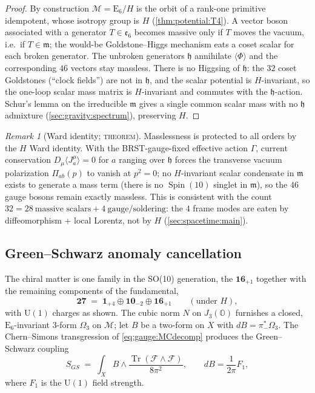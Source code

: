 \documentclass[11pt]{article}
\theoremstyle{plain}
\theoremstyle{definition}
\theoremstyle{remark}
\newtheorem{remark}[theorem]{Remark}
\newcommand{\U}[1]{\mathrm{U}(#1)}
\newcommand{\E}[1]{\mathrm{E}_{#1}}
\newcommand{\Spin}{\operatorname{Spin}}
\newcommand{\Tr}{\operatorname{Tr}}
\newcommand{\Uone}{\U{1}}
\newcommand{\ESix}{\E{6}}
\begin{document}
\begin{proof}
By construction $\mathcal M=\ESix/H$ is the orbit of a rank-one primitive
idempotent, whose isotropy group is $H$ (\autoref{thm:potential:T4}).
A vector boson associated with a generator $T\in\mathfrak e_6$ becomes
massive only if $T$ moves the vacuum, i.e.\ if $T\in\mathfrak m$; the
would-be Goldstone--Higgs mechanism eats a coset scalar for each broken
generator. The unbroken generators $\mathfrak h$ annihilate
$\langle\Phi\rangle$ and the corresponding $46$ vectors stay massless.
There is no Higgsing of $\mathfrak h$: the $32$ coset Goldstones
(``clock fields'') are not in $\mathfrak h$, and the scalar potential is
$H$-invariant, so the one-loop scalar mass matrix is $H$-invariant and
commutes with the $\mathfrak h$-action. Schur's lemma on the irreducible
$\mathfrak m$ gives a single common scalar mass with no $\mathfrak h$
admixture (\autoref{sec:gravity:spectrum}), preserving $H$.
\end{proof}

\begin{remark}[Ward identity; \textsc{theorem}]\label{rem:gauge:ward}
Masslessness is protected to all orders by the $H$ Ward identity. With
the BRST-gauge-fixed effective action $\Gamma$, current conservation
$D_\mu\langle J^{\mu}_{a}\rangle=0$ for $a$ ranging over $\mathfrak h$
forces the transverse vacuum polarization $\Pi_{ab}(p)$ to vanish at
$p^2=0$; no $H$-invariant scalar condensate in $\mathfrak m$ exists to
generate a mass term (there is no $\Spin(10)$ singlet in $\mathfrak m$),
so the $46$ gauge bosons remain exactly massless. This is consistent with
the count $32 = 28\ \text{massive scalars} + 4\ \text{gauge/soldering}$:
the $4$ frame modes are eaten by diffeomorphism $+$ local Lorentz, not by
$H$ (\autoref{sec:spacetime:main}).
\end{remark}

\subsection{Green--Schwarz anomaly cancellation}
\label{sec:gauge:gs}

The chiral matter is one family in the SO(10) generation, the
$\mathbf{16}_{+1}$ together with the remaining components of the
fundamental,
\begin{equation}\label{eq:gauge:matter}
  \mathbf{27}
  \;=\;
  \mathbf 1_{+4}\oplus\mathbf{10}_{-2}\oplus\mathbf{16}_{+1}
  \qquad(\text{under }H),
\end{equation}
with $\Uone$ charges as shown. The cubic norm $N$ on $J_3(\mathbb O)$
furnishes a closed, $\ESix$-invariant $3$-form $\Omega_3$ on $\mathcal M$;
let $B$ be a two-form on $X$ with $dB=\pi_-^{*}\Omega_3$. The
Chern--Simons transgression of \eqref{eq:gauge:MCdecomp} produces the
Green--Schwarz coupling
\begin{equation}\label{eq:gauge:GS}
  S_{GS}
  \;=\;
  \int_{X} B\wedge\frac{\Tr(\mathcal F\wedge\mathcal F)}{8\pi^{2}},
  \qquad
  dB=\frac{1}{2\pi}F_{1},
\end{equation}
where $F_1$ is the $\Uone$ field strength.
\end{document}

